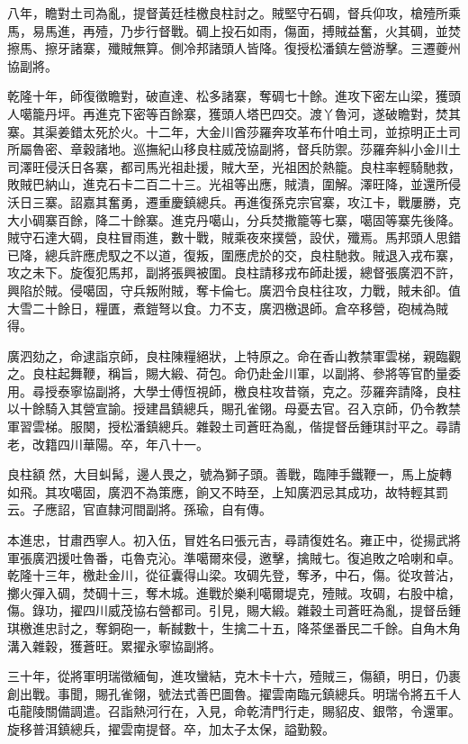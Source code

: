 \begin{pinyinscope}
八年，瞻對土司為亂，提督黃廷桂檄良柱討之。賊堅守石碉，督兵仰攻，槍殪所乘馬，易馬進，再殪，乃步行督戰。碉上投石如雨，傷面，搏賊益奮，火其碉，並焚擦馬、擦牙諸寨，殲賊無算。側冷邦諸頭人皆降。復授松潘鎮左營游擊。三遷夔州協副將。

乾隆十年，師復徵瞻對，破直達、松多諸寨，奪碉七十餘。進攻下密左山梁，獲頭人噶籠丹坪。再進克下密等百餘寨，獲頭人塔巴四交。渡丫魯河，遂破瞻對，焚其寨。其渠姜錯太死於火。十二年，大金川酋莎羅奔攻革布什咱土司，並掠明正土司所屬魯密、章穀諸地。巡撫紀山移良柱威茂協副將，督兵防禦。莎羅奔糾小金川土司澤旺侵沃日各寨，都司馬光祖赴援，賊大至，光祖困於熱籠。良柱率輕騎馳救，敗賊巴納山，進克石卡二百二十三。光祖等出應，賊潰，圍解。澤旺降，並還所侵沃日三寨。詔嘉其奮勇，遷重慶鎮總兵。再進復孫克宗官寨，攻江卡，戰屢勝，克大小碉寨百餘，降二十餘寨。進克丹噶山，分兵焚撒籠等七寨，噶固等寨先後降。賊守石達大碉，良柱冒雨進，數十戰，賊乘夜來撲營，設伏，殲焉。馬邦頭人思錯已降，總兵許應虎馭之不以道，復叛，圍應虎於的交，良柱馳救。賊退入戎布寨，攻之未下。旋復犯馬邦，副將張興被圍。良柱請移戎布師赴援，總督張廣泗不許，興陷於賊。侵噶固，守兵叛附賊，奪卡倫七。廣泗令良柱往攻，力戰，賊未卻。值大雪二十餘日，糧匱，煮鎧弩以食。力不支，廣泗檄退師。倉卒移營，砲械為賊得。

廣泗劾之，命逮詣京師，良柱陳糧絕狀，上特原之。命在香山教禁軍雲梯，親臨觀之。良柱起舞鞭，稱旨，賜大緞、荷包。命仍赴金川軍，以副將、參將等官酌量委用。尋授泰寧協副將，大學士傅恆視師，檄良柱攻昔嶺，克之。莎羅奔請降，良柱以十餘騎入其營宣諭。授建昌鎮總兵，賜孔雀翎。母憂去官。召入京師，仍令教禁軍習雲梯。服闋，授松潘鎮總兵。雜穀土司蒼旺為亂，偕提督岳鍾琪討平之。尋請老，改籍四川華陽。卒，年八十一。

良柱額然，大目虯髯，邊人畏之，號為獅子頭。善戰，臨陣手鐵鞭一，馬上旋轉如飛。其攻噶固，廣泗不為策應，餉又不時至，上知廣泗忌其成功，故特輕其罰云。子應詔，官直隸河間副將。孫瑜，自有傳。

本進忠，甘肅西寧人。初入伍，冒姓名曰張元吉，尋請復姓名。雍正中，從揚武將軍張廣泗援吐魯番，屯魯克沁。準噶爾來侵，邀擊，擒賊七。復追敗之哈喇和卓。乾隆十三年，檄赴金川，從征囊得山梁。攻碉先登，奪矛，中石，傷。從攻普沾，擲火彈入碉，焚碉十三，奪木城。進戰於樂利噶爾堤克，殪賊。攻碉，右股中槍，傷。錄功，擢四川威茂協右營都司。引見，賜大緞。雜穀土司蒼旺為亂，提督岳鍾琪檄進忠討之，奪銅砲一，斬馘數十，生擒二十五，降茶堡番民二千餘。自角木角溝入雜穀，獲蒼旺。累擢永寧協副將。

三十年，從將軍明瑞徵緬甸，進攻蠻結，克木卡十六，殪賊三，傷額，明日，仍裹創出戰。事聞，賜孔雀翎，號法式善巴圖魯。擢雲南臨元鎮總兵。明瑞令將五千人屯龍陵關備調遣。召詣熱河行在，入見，命乾清門行走，賜貂皮、銀幣，令還軍。旋移普洱鎮總兵，擢雲南提督。卒，加太子太保，謚勤毅。


\end{pinyinscope}
